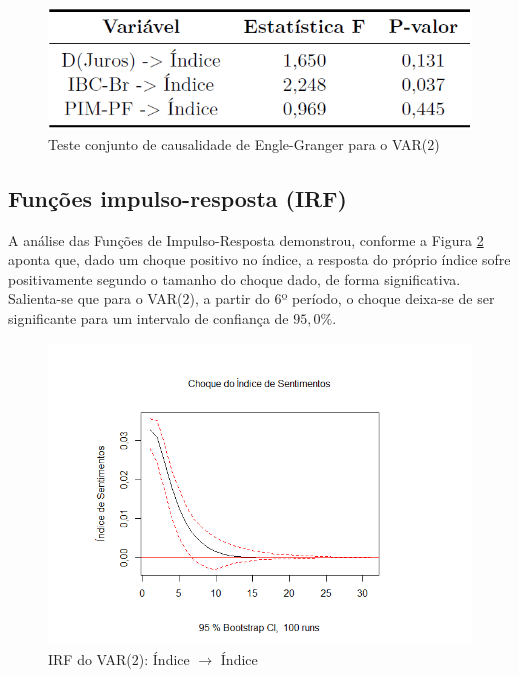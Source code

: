 \begin{figure}[hbtp]
	\centering
	\caption{Teste conjunto de causalidade de Engle-Granger para o VAR($2$)} \label{figure:granger_conjunto_model2}
	\includegraphics[scale = 0.50]{figuras/granger_conjunto_model2.PNG}
\end{figure}

\subsection{Funções impulso-resposta (IRF)}

A análise das Funções de Impulso-Resposta demonstrou, conforme a Figura \ref{figure:irf_indice_indice_model_2} aponta que, dado um choque positivo no índice, a resposta do próprio índice sofre positivamente segundo o tamanho do choque dado, de forma significativa. Salienta-se que para o VAR($2$), a partir do 6º período, o choque deixa-se de ser significante para um intervalo de confiança de $95,0\%$.

\begin{figure}[hbtp]
	\centering
	\caption{IRF do VAR($2$): Índice $\rightarrow$ Índice} \label{figure:irf_indice_indice_model_2}
	\includegraphics[scale = 0.60]{figuras/irf_indice_indice_model_2.PNG}
\end{figure}


